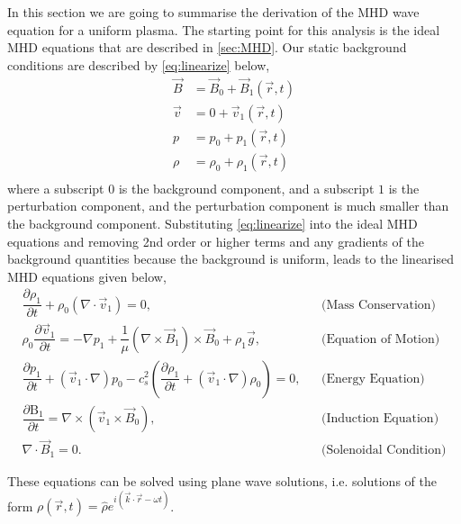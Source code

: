 In this section we are going to summarise the derivation of the MHD wave equation for a uniform plasma.
The starting point for this analysis is the ideal MHD equations that are described in \ref{sec:MHD}.
Our static background conditions are described by \ref{eq:linearize} below,
\begin{equation}\label{eq:linearize}
    \begin{aligned}                                                    
        \vec{B} &= \vec{B}_0 + \vec{B}_1(\vec{r},t)\\
        \vec{v} &= 0 + \vec{v}_1(\vec{r},t)\\
        p &= p_0 + {p_1}(\vec{r},t)\\
        \rho &= \rho_0 + {\rho_1}(\vec{r},t)\\
    \end{aligned}
\end{equation}
where a subscript $0$ is the background component, and a subscript $1$ is the perturbation component, and the perturbation component is much smaller than the background component.
Substituting \ref{eq:linearize} into the ideal MHD equations and removing 2nd order or higher terms and any gradients of the background quantities because the background is uniform, leads to the linearised MHD equations given below,
\begin{align}                                                         
    \dfrac{\partial \rho_1 }{\partial t} + \rho_0 (\nabla \cdot \vec{v}_1) =       
    0,
    &&\text{(Mass Conservation)}\label{eq:lmhd_mass}\\
    \rho_0 \dfrac{\partial \vec{v}_1}{\partial t} =
    -\nabla p_1 + \dfrac{1}{\mu}(\nabla \times \vec{B}_1) \times \vec{B}_0 + \rho_1 \vec{g},
    &&\text{(Equation of Motion)}\label{eq:lmhd_motion}\\
    \dfrac{\partial p_1}{\partial t} + (\vec{v}_1 \cdot \nabla)p_0 - c_s^2 \left( \dfrac{\partial \rho_1}{\partial t} + (\vec{v}_1 \cdot \nabla)\rho_0 \right) = 0,
    &&\text{(Energy Equation)}\label{eq:lmhd_energy}\\
    \dfrac{\partial \mathrm{B}_1}{\partial t} = \nabla \times (\vec{v}_1 \times \vec{B}_0),
    &&\text{(Induction Equation)}\label{eq:lmhd_induction}\\
    \nabla \cdot \vec{B}_1 = 0.
    &&\text{(Solenoidal Condition)}\label{eq:lmhd_solenoid}              
\end{align}

These equations can be solved using plane wave solutions, i.e. solutions of the form $\rho(\vec{r}, t) = \hat{\rho} e^{i(\vec{k}\cdot\vec{r} - \omega t)}$.

